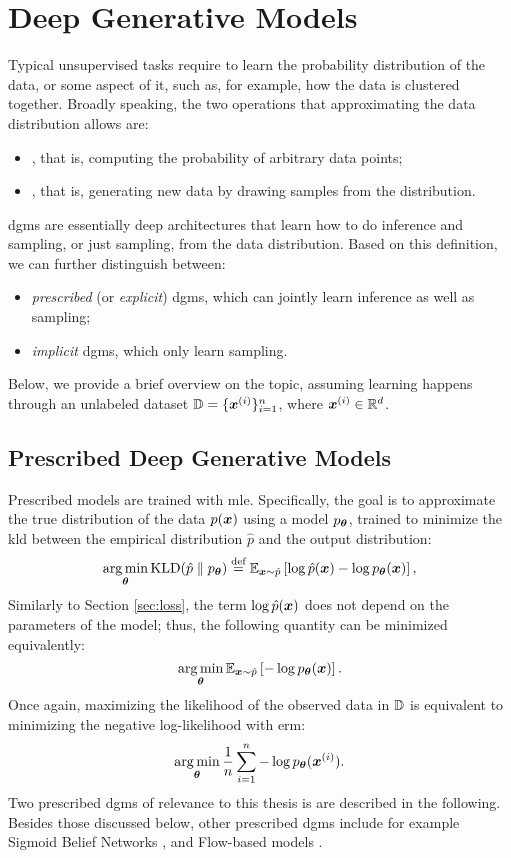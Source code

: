 \section{Deep Generative Models}\label{sec:dgm}
Typical unsupervised tasks require to learn the probability distribution of the data, or some aspect of it, such as, for example, how the data is clustered together. Broadly speaking, the two operations that approximating the data distribution allows are:
\begin{itemize}
    \item {}, that is, computing the probability of arbitrary data points;
    \item {}, that is, generating new data by drawing samples from the distribution.
\end{itemize}
\glspl{dgm} \citep{goodfellow2016dl} are essentially deep architectures that learn how to do inference and sampling, or just sampling, from the data distribution. Based on this definition, we can further distinguish between:
\begin{itemize}
    \item \emph{prescribed} (or \emph{explicit}) \glspl{dgm}, which can jointly learn inference as well as sampling;
    \item \emph{implicit} \glspl{dgm}, which only learn sampling.
\end{itemize}
Below, we provide a brief overview on the topic, assuming learning happens through an unlabeled dataset $\Data = \{\PatternVector{x}{i}\}_{i=1}^n$, where $\PatternVector{x}{i} \in \Real^d$.

\subsection{Prescribed Deep Generative Models}\label{sec:autoregressive}
Prescribed models are trained with \gls{mle}. Specifically, the goal is to approximate the true distribution of the data $p(\Vector{x})$ using a model $p_{\boldsymbol{\theta}}$, trained to minimize the \gls{kld} between the empirical distribution $\hat{p}$ and the output distribution:
$$\argmin_{\Param} \KLD{\hat{p}}{p_{\Param}} \defeq \Expectation{\Vector{x} \sim \hat{p}}{\log \hat{p}(\Vector{x}) -\log p_{\Param}(\Vector{x})},$$
Similarly to Section \ref{sec:loss}, the term $\log \hat{p}(\Vector{x})$ does not depend on the parameters of the model; thus, the following quantity can be minimized equivalently:
$$\argmin_{\Param} \Expectation{\Vector{x} \sim \hat{p}}{-\log p_{\Param}(\Vector{x})}.$$
Once again, maximizing the likelihood of the observed data in $\mathbb{D}$ is equivalent to minimizing the negative log-likelihood with \gls{erm}:
$$\argmin_{\Param} \frac{1}{n} \sum_{i=1}^n -\log p_{\Param}(\PatternVector{x}{i}).$$
Two prescribed \glspl{dgm} of relevance to this thesis is are described in the following. Besides those discussed below, other prescribed \glspl{dgm} include for example Sigmoid Belief Networks \citep{neal1992sigmoidbeliefnet}, and Flow-based models \citep{rezende2015normalizingflows}.

